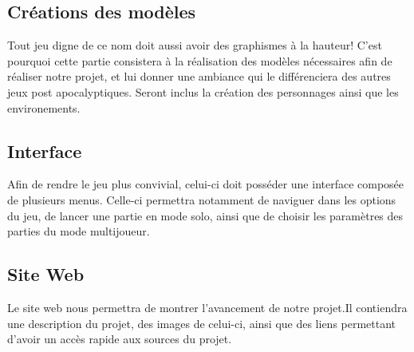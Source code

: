 ﻿\documentclass{article}
\begin{document}
\subsection{Créations des modèles}
Tout jeu digne de ce nom doit aussi avoir des graphismes à la hauteur!
C'est pourquoi cette partie consistera à la réalisation des modèles nécessaires
afin de réaliser notre projet, et lui donner une ambiance qui le différenciera des autres
jeux post apocalyptiques. Seront inclus la création des personnages ainsi que les environements.


\subsection{Interface}
Afin de rendre le jeu plus convivial, celui-ci doit posséder 
une interface composée de plusieurs menus. Celle-ci 
permettra notamment de naviguer dans les options du jeu, de
 lancer une partie en mode solo, ainsi que de choisir les
 paramètres des parties du mode multijoueur.

\newpage\subsection{Site Web}
Le site web nous permettra de montrer l'avancement de notre projet.Il contiendra une description du projet, des images de celui-ci, ainsi
que des liens permettant d'avoir un accès rapide aux sources du projet.
\end{document}
